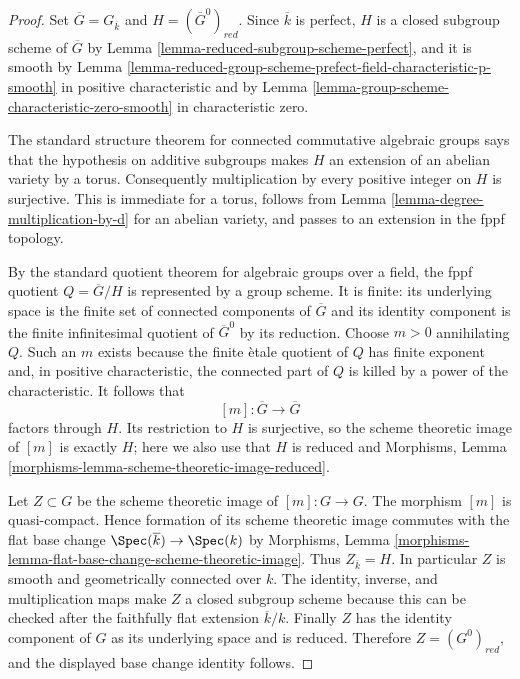 \begin{proof}
Set $\overline{G}=G_{\overline{k}}$ and
$H=(\overline{G}^0)_{red}$. Since $\overline{k}$ is perfect, $H$ is a closed
subgroup scheme of $\overline{G}$ by
Lemma \ref{lemma-reduced-subgroup-scheme-perfect}, and it is smooth by
Lemma \ref{lemma-reduced-group-scheme-prefect-field-characteristic-p-smooth}
in positive characteristic and by
Lemma \ref{lemma-group-scheme-characteristic-zero-smooth} in characteristic
zero.

The standard structure theorem for connected commutative algebraic groups
says that the hypothesis on additive subgroups makes $H$ an extension of an
abelian variety by a torus. Consequently multiplication by every positive
integer on $H$ is surjective. This is immediate for a torus, follows from
Lemma \ref{lemma-degree-multiplication-by-d} for an abelian variety, and
passes to an extension in the fppf topology.

By the standard quotient theorem for algebraic groups over a field, the fppf
quotient $Q=\overline{G}/H$ is represented by a group scheme. It is finite:
its underlying space is the finite set of connected components of
$\overline{G}$ and its identity component is the finite infinitesimal quotient
of $\overline{G}^0$ by its reduction. Choose $m>0$ annihilating $Q$. Such an
$m$ exists because the finite \`etale quotient of $Q$ has finite exponent and,
in positive characteristic, the connected part of $Q$ is killed by a power of
the characteristic. It follows that
$$
[m] : \overline{G}\longrightarrow\overline{G}
$$
factors through $H$. Its restriction to $H$ is surjective, so the scheme
theoretic image of $[m]$ is exactly $H$; here we also use that $H$ is reduced
and Morphisms, Lemma
\ref{morphisms-lemma-scheme-theoretic-image-reduced}.

Let $Z\subset G$ be the scheme theoretic image of $[m]:G\to G$. The morphism
$[m]$ is quasi-compact. Hence formation of its scheme theoretic image
commutes with the flat base change $\Spec(\overline{k})\to\Spec(k)$ by
Morphisms, Lemma
\ref{morphisms-lemma-flat-base-change-scheme-theoretic-image}. Thus
$Z_{\overline{k}}=H$. In particular $Z$ is smooth and geometrically
connected over $k$. The identity, inverse, and multiplication maps make $Z$
a closed subgroup scheme because this can be checked after the faithfully
flat extension $\overline{k}/k$. Finally $Z$ has the identity component of
$G$ as its underlying space and is reduced. Therefore $Z=(G^0)_{red}$, and
the displayed base change identity follows.
\end{proof}

